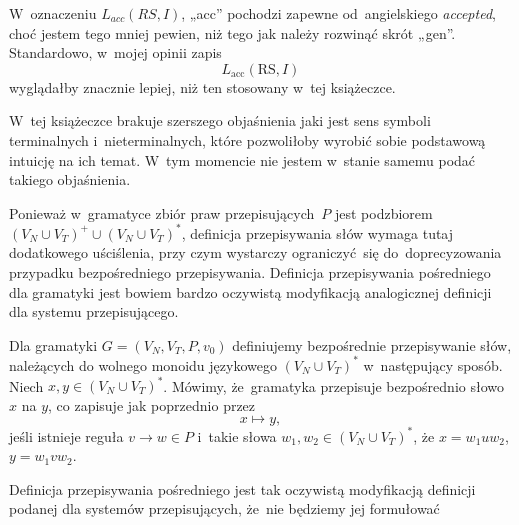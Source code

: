 \documentclass[a4paper,11pt]{article}
\begin{document}
\vspace{\spaceFour}





 W~oznaczeniu $L_{ acc }( RS, I )$, „acc” pochodzi zapewne
od~angielskiego \textit{accepted}, choć jestem tego mniej pewien, niż tego
jak należy rozwinąć skrót „gen”. Standardowo, w~mojej opinii zapis
\begin{equation}
  \label{eq:Forys-Forys-80}
  L_{ \textrm{acc} }( \textrm{RS}, I )
\end{equation}
wyglądałby znacznie lepiej, niż ten stosowany w~tej książeczce.

\vspace{\spaceFour}





 W~tej książeczce brakuje szerszego objaśnienia jaki jest
sens symboli terminalnych i~nieterminalnych, które pozwoliłoby wyrobić
sobie podstawową intuicję na ich temat. W~tym momencie nie jestem w~stanie
samemu podać takiego objaśnienia.

\vspace{\spaceFour}





 Ponieważ w~gramatyce zbiór praw przepisujących~$P$ jest
podzbiorem $( V_{ N } \cup V_{ T } )^{ + } \cup ( V_{ N } \cup V_{ T } )^{ * }$,
definicja przepisywania słów wymaga tutaj dodatkowego uściślenia, przy czym
wystarczy ograniczyć~się do~doprecyzowania przypadku bezpośredniego
przepisywania. Definicja przepisywania pośredniego dla gramatyki jest
bowiem bardzo  oczywistą modyfikacją analogicznej definicji dla systemu
przepisującego.

Dla gramatyki $G = ( V_{ N }, V_{ T }, P, v_{ 0 } )$ definiujemy bezpośrednie
przepisywanie słów, należących do wolnego monoidu językowego
$( V_{ N } \cup V_{ T } )^{ * }$ w~następujący sposób. Niech
$x, y \in ( V_{ N } \cup V_{ T } )^{ * }$. Mówimy, że~gramatyka przepisuje
bezpośrednio słowo $x$ na $y$, co zapisuje jak poprzednio przez
\begin{equation}
  \label{eq:Forys-Forys-81}
  x \mapsto y,
\end{equation}
jeśli istnieje reguła $v \to w \in P$ i~takie słowa
$w_{ 1 }, w_{ 2 } \in ( V_{ N } \cup V_{ T } )^{ * }$, że $x = w_{ 1 } u w_{ 2 }$,
$y = w_{ 1 } v w_{ 2 }$.

Definicja przepisywania pośredniego jest tak oczywistą modyfikacją
definicji podanej dla systemów przepisujących, że~nie będziemy jej
formułować
\end{document}
